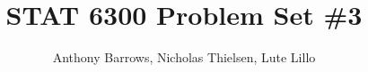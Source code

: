 \documentclass[]{article}
\title{STAT 6300 Problem Set \#3}
\author{Anthony Barrows, Nicholas Thielsen, Lute Lillo}
\begin{document}
\maketitle

\section{}







\section{}



\section{}


\end{document}
